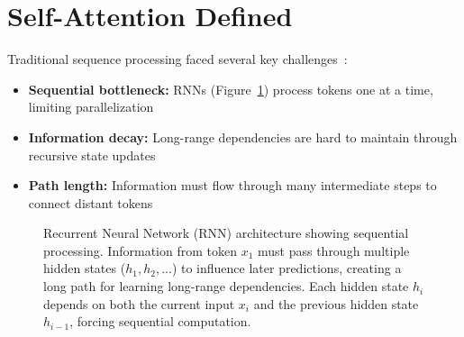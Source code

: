 \section{Self-Attention Defined}
\label{sec:self_attention}

\noindent
Traditional sequence processing faced several key challenges~\cite{hochreiter1997long,bahdanau2014neural}:
\begin{itemize}
    \item \textbf{Sequential bottleneck:} RNNs (Figure~\ref{fig:rnn_architecture}) process tokens one at a time, limiting parallelization
    \item \textbf{Information decay:} Long-range dependencies are hard to maintain through recursive state updates
    \item \textbf{Path length:} Information must flow through many intermediate steps to connect distant tokens
\end{itemize}

\begin{figure}[h]
\centering
{}
\caption{Recurrent Neural Network (RNN) architecture showing sequential processing. Information from token $x_1$ must pass through multiple hidden states ($h_1, h_2, ...$) to influence later predictions, creating a long path for learning long-range dependencies. Each hidden state $h_i$ depends on both the current input $x_i$ and the previous hidden state $h_{i-1}$, forcing sequential computation.}
\label{fig:rnn_architecture}
\end{figure}

